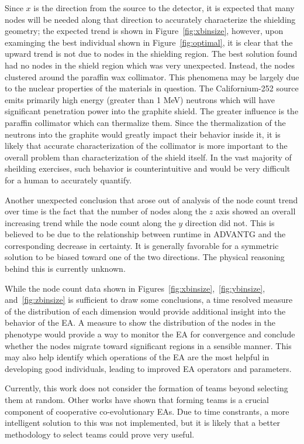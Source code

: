 \documentclass[conference]{IEEEtran}
\begin{document}
Since $x$ is the direction from the source to the detector, it is expected that many nodes will be needed along that direction to accurately characterize the shielding geometry; the expected trend is shown in Figure~\ref{fig:xbinsize}, however, upon examinging the best individual shown in Figure~\ref{fig:optimal}, it is clear that the upward trend is not due to nodes in the shielding region. The best solution found had no nodes in the shield region which was very unexpected. Instead, the nodes clustered around the paraffin wax collimator. This phenomena may be largely due to the nuclear properties of the materials in question. The Californium-252 source emits primarily high energy (greater than 1 MeV) neutrons which will have significant penetration power into the graphite shield. The greater influence is the paraffin collimator which can thermalize them. Since the thermalization of the neutrons into the graphite would greatly impact their behavior inside it, it is likely that accurate characterization of the collimator is more important to the overall problem than characterization of the shield itself. In the vast majority of sheilding exercises, such behavior is counterintuitive and would be very difficult for a human to accurately quantify.

Another unexpected conclusion that arose out of analysis of the node count trend over time is the fact that the number of nodes along the $z$ axis showed an overall increasing trend while the node count along the $y$ direction did not. This is believed to be due to the relationship between runtime in ADVANTG and the corresponding decrease in certainty. It is generally favorable for a symmetric solution to be biased toward one of the two directions. The physical reasoning behind this is currently unknown.

While the node count data shown in Figures~\ref{fig:xbinsize},~\ref{fig:ybinsize}, and~\ref{fig:zbinsize} is sufficient to draw some conclusions, a time resolved measure of the distribution of each dimension would provide additional insight into the behavior of the EA. A measure to show the distribution of the nodes in the phenotype would provide a way to monitor the EA for convergence and conclude whether the nodes migrate toward significant regions in a sensible manner. This may also help identify which operations of the EA are the most helpful in developing good individuals, leading to improved EA operators and parameters.

Currently, this work does not consider the formation of teams beyond selecting them at random. Other works \cite{ref:Bucci2005} have shown that forming teams is a crucial component of cooperative co-evolutionary EAs. Due to time constrants, a more intelligent solution to this was not implemented, but it is likely that a better methodology to select teams could prove very useful.
\end{document}
